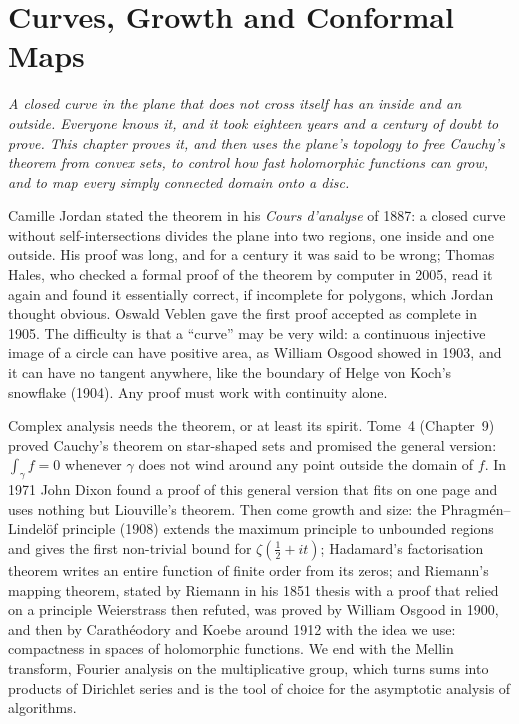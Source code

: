 \chapter{Curves, Growth and Conformal Maps}

\begin{center}\itshape
A closed curve in the plane that does not cross itself has an inside and an outside. Everyone knows it, and it took eighteen years
and a century of doubt to prove. This chapter proves it, and then uses the plane's topology to free Cauchy's theorem from convex sets, to control how fast
holomorphic functions can grow, and to map every simply connected domain onto a disc.
\end{center}

Camille Jordan stated the theorem in his \emph{Cours d'analyse} of 1887: a closed curve without self-intersections divides the plane into two
regions, one inside and one outside. His proof was long, and for a century it was said to be wrong; Thomas Hales, who checked a
formal proof of the theorem by computer in 2005, read it again and found it essentially correct, if incomplete for polygons, which
Jordan thought obvious. Oswald Veblen gave the first proof accepted as complete in 1905. The difficulty is that a ``curve'' may be
very wild: a continuous injective image of a circle can have positive area, as William Osgood showed in 1903, and it can have no tangent anywhere, like the boundary of Helge von Koch's
snowflake (1904).
Any proof must work with continuity alone.

Complex analysis needs the theorem, or at least its spirit. Tome~4 (Chapter~9) proved Cauchy's theorem on star-shaped sets and promised the
general version: $\int_\gamma f=0$ whenever $\gamma$ does not wind around any point outside the domain of $f$. In 1971 John Dixon found a proof of this
general version that fits on one page and uses nothing but Liouville's theorem. Then come growth and size: the Phragm\'en--Lindel\"of principle
(1908) extends the maximum principle to unbounded regions and gives the first non-trivial bound for $\zeta(\frac12+it)$; Hadamard's
factorisation theorem writes an entire function of finite order from its zeros; and Riemann's mapping theorem, stated by Riemann in his 1851
thesis with a proof that relied on a principle Weierstrass then refuted, was proved by William Osgood in 1900, and then by Carath\'eodory and Koebe
around 1912 with the idea we use: compactness in spaces of holomorphic functions. We end with the Mellin transform, Fourier analysis on the multiplicative group, which turns sums into
products of Dirichlet series and is the tool of choice for the asymptotic analysis of algorithms.


